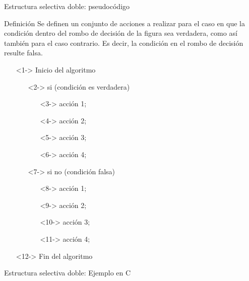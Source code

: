 \documentclass[xcolor=pdftex,table,11pt]{beamer}
\begin{document}
\begin{frame}{Estructura selectiva doble: pseudocódigo}
\begin{block}{Definición}
Se definen un conjunto de acciones a realizar para el caso en que la condición dentro del rombo de decisión de la figura sea verdadera, como así también para el caso contrario. Es decir, la condición en el rombo de decisión resulte falsa.
\end{block}

 \begin{itemize}
   \item[]<1-> Inicio del algoritmo

   \begin{itemize}
   
     	\item[]<2-> si (condición es verdadera)
     	\begin{itemize}
     			\item[]<3->  acción 1;
     			\item[]<4->  acción 2;
     			\item[]<5->  acción 3;
     			\item[]<6->  acción 4;
     	\end{itemize}
          	\item[]<7-> si no (condición falsa)
     	\begin{itemize}
     			\item[]<8->  acción 1;
     			\item[]<9->  acción 2;
     			\item[]<10->  acción 3;
     			\item[]<11->  acción 4;
     	\end{itemize}
   \end{itemize}
  \item[]<12-> Fin del algoritmo
\end{itemize}

\end{frame}



\begin{frame}{Estructura selectiva doble: Ejemplo en C}
\codesetstylefrombeamer
{}
\end{frame}
\end{document}

